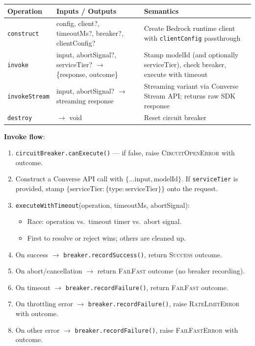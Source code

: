 \documentclass[10pt,letterpaper]{article}
\newcommand{\op}[1]{\textsc{#1}}
\newcommand{\fn}[1]{\texttt{#1}}
\newcommand{\fld}[1]{\texttt{#1}}
\begin{document}
\smallskip
\begin{tabular}{@{}l l p{7cm}@{}}
\toprule
\textbf{Operation} & \textbf{Inputs / Outputs} & \textbf{Semantics} \\
\midrule
\fn{construct} & config, client?, timeoutMs?, breaker?, clientConfig? & Create Bedrock runtime client with \fld{clientConfig} passthrough \\
\fn{invoke} & input, abortSignal?, serviceTier? $\to$ \{response, outcome\} & Stamp modelId (and optionally serviceTier), check breaker, execute with timeout \\
\fn{invokeStream} & input, abortSignal? $\to$ streaming response & Streaming variant via Converse Stream API; returns raw SDK response \\
\fn{destroy} & $\to$ void & Reset circuit breaker \\
\bottomrule
\end{tabular}

\medskip
\noindent\textbf{Invoke flow}:
\begin{enumerate}[nosep]
  \item \fn{circuitBreaker.canExecute()} --- if false, raise \op{CircuitOpenError} with outcome.
  \item Construct a Converse API call with $\{\ldots\text{input}, \text{modelId}\}$. If \fld{serviceTier} is provided, stamp $\{\text{serviceTier}: \{\text{type}: \text{serviceTier}\}\}$ onto the request.
  \item \fn{executeWithTimeout}(operation, timeoutMs, abortSignal):
  \begin{itemize}[nosep]
    \item Race: operation vs.\ timeout timer vs.\ abort signal.
    \item First to resolve or reject wins; others are cleaned up.
  \end{itemize}
  \item On success $\to$ \fn{breaker.recordSuccess()}, return \op{Success} outcome.
  \item On abort/cancellation $\to$ return \op{FailFast} outcome (no breaker recording).
  \item On timeout $\to$ \fn{breaker.recordFailure()}, return \op{FailFast} outcome.
  \item On throttling error $\to$ \fn{breaker.recordFailure()}, raise \op{RateLimitError} with outcome.
  \item On other error $\to$ \fn{breaker.recordFailure()}, raise \op{FailFastError} with outcome.
\end{enumerate}
\end{document}

